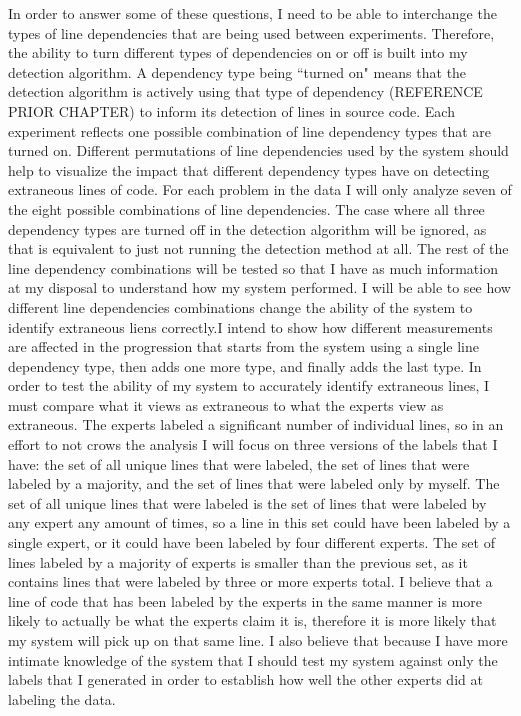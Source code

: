 \documentclass[draft]{article}
\begin{document}
In order to answer some of these questions, I need to be able to interchange the types of line dependencies that are being used between experiments. Therefore, the ability to turn different types of dependencies on or off is built into my detection algorithm. A dependency type being ``turned on" means that the detection algorithm is actively using that type of dependency {\color{red}(REFERENCE PRIOR CHAPTER)} to inform its detection of lines in source code. Each experiment reflects one possible combination of line dependency types that are turned on. Different permutations of line dependencies used by the system should help to visualize the impact that different dependency types have on detecting extraneous lines of code. For each problem in the data I will only analyze seven of the eight possible combinations of line dependencies. The case where all three dependency types are turned off in the detection algorithm will be ignored, as that is equivalent to just not running the detection method at all. The rest of the line dependency combinations will be tested so that I have as much information at my disposal to understand how my system performed. I will be able to see how different line dependencies combinations change the ability of the system to identify extraneous liens correctly.I intend to show how different measurements are affected in the progression that starts from the system using a single line dependency type, then adds one more type, and finally adds the last type. 
In order to test the ability of my system to accurately identify extraneous lines, I must compare what it views as extraneous to what the experts view as extraneous. The experts labeled a significant number of individual lines, so in an effort to not crows the analysis I will focus on three versions of the labels that I have: the set of all unique lines that were labeled, the set of lines that were labeled by a majority, and the set of lines that were labeled only by myself. The set of all unique lines that were labeled is the set of lines that were labeled by any expert any amount of times, so a line in this set could have been labeled by a single expert, or it could have been labeled by four different experts. The set of lines labeled by a majority of experts is smaller than the previous set, as it contains lines that were labeled by three or more experts total. I believe that a line of code that has been labeled by the experts in the same manner is more likely to actually be what the experts claim it is, therefore it is more likely that my system will pick up on that same line. I also believe that because I have more intimate knowledge of the system that I should test my system against only the labels that I generated in order to establish how well the other experts did at labeling the data. 
\end{document}
